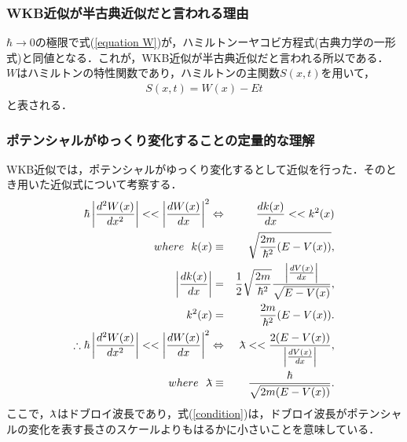 \documentclass[12pt]{jsarticle}
\numberwithin{equation}{section}
\newcommand{\lambdabar}{\lambda \kern -0.5em\raise 0.6ex \hbox{--}}
\begin{document}
\subsubsection{WKB近似が半古典近似だと言われる理由}
$\hbar\to0$の極限で式(\ref{equation W})が，ハミルトンーヤコビ方程式(古典力学の一形式)と同値となる．これが，WKB近似が半古典近似だと言われる所以である．
$W$はハミルトンの特性関数であり，ハミルトンの主関数$S(x,t)$を用いて，
\begin{eqnarray}
	S(x,t) = W(x) - E t \nonumber
\end{eqnarray}
と表される．

\subsubsection{ポテンシャルがゆっくり変化することの定量的な理解}
WKB近似では，ポテンシャルがゆっくり変化するとして近似を行った．そのとき用いた近似式について考察する．
\begin{eqnarray}\label{condition}
	\hbar \left|\frac{d^2W(x)}{dx^2}\right| << \left|\frac{dW(x)}{dx}\right|^2 \Leftrightarrow&& \frac{dk(x)}{dx} << k^2(x)\nonumber\\
	where ~~ k(x)\equiv&&\sqrt{\frac{2m}{\hbar^2}(E-V(x))},\nonumber\\
	\left|\frac{dk(x)}{dx}\right| =&& \frac{1}{2}\sqrt{\frac{2m}{\hbar^2}} \frac{\left|\frac{dV(x)}{dx}\right|}{\sqrt{E-V(x)}},\nonumber\\
	k^2(x) =&&  \frac{2m}{\hbar^2}(E-V(x)).\nonumber\\
	\therefore \hbar \left|\frac{d^2W(x)}{dx^2}\right| << \left|\frac{dW(x)}{dx}\right|^2 \Leftrightarrow&& \lambdabar << \frac{2(E-V(x))}{\left|\frac{dV(x)}{dx}\right|}, \\
	where ~~ \lambdabar \equiv&& \frac{\hbar}{\sqrt{2m(E-V(x))}}. \nonumber
\end{eqnarray}
ここで，$\lambdabar$はドブロイ波長であり，式(\ref{condition})は，ドブロイ波長がポテンシャルの変化を表す長さのスケールよりもはるかに小さいことを意味している．
\end{document}
